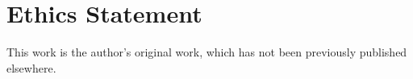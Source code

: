 
\section*{Ethics Statement}

This work is the author's original work, which has not been previously published
elsewhere.
